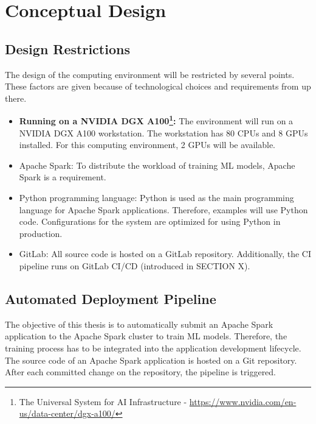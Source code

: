 \chapter{Conceptual Design}
\label{chap:05_design}
%


\section{Design Restrictions}
\label{sec:05_restrictions}
The design of the computing environment will be restricted by several points. These factors are given because of technological choices and requirements from up there.

\begin{itemize}
\item \textbf{Running on a NVIDIA DGX A100\footnote{The Universal System for AI Infrastructure - \url{https://www.nvidia.com/en-us/data-center/dgx-a100/}}:} The environment will run on a NVIDIA DGX A100 workstation. The workstation has 80 CPUs and 8 GPUs installed. For this computing environment, 2 GPUs will be available.

\item Apache Spark: To distribute the workload of training ML models, Apache Spark is a requirement.

\item Python programming language: Python is used as the main programming language for Apache Spark applications. Therefore, examples will use Python code. Configurations for the system are optimized for using Python in production.

\item GitLab: All source code is hosted on a GitLab repository. Additionally, the CI pipeline runs on GitLab CI/CD (introduced in SECTION X).
\end{itemize}

\section{Automated Deployment Pipeline}
The objective of this thesis is to automatically submit an Apache Spark application to the Apache Spark cluster to train ML models. Therefore, the training process has to be integrated into the application development lifecycle.
The source code of an Apache Spark application is hosted on a Git repository. After each committed change on the repository, the pipeline is triggered.


